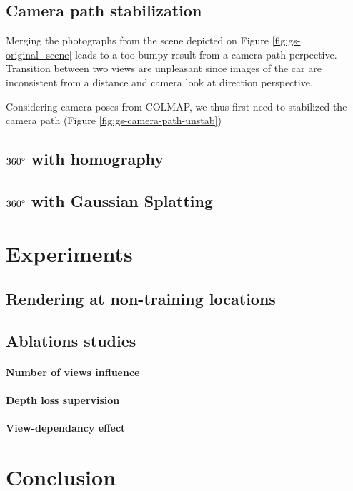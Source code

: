 \subsection{Camera path stabilization}
Merging the photographs from the scene depicted on Figure \ref{fig:gs-original_scene} leads to a too bumpy result from a camera path perpective. Transition between two views are unpleasant since images of the car are inconsistent from a distance and camera look at direction perspective.

Considering camera poses from COLMAP, we thus first need to stabilized the camera path (Figure \ref{fig:gs-camera-path-unstab})




\begin{center}
  \label{fig:gs-unstabilized}
\end{center}


\subsection{$360\degree$ with homography}


\subsection{$360\degree$ with Gaussian Splatting}
\section{Experiments}
\subsection{Rendering at non-training locations}

\subsection{Ablations studies}
\paragraph{Number of views influence}
\paragraph{Depth loss supervision}
\paragraph{View-dependancy effect}
\section{Conclusion}
